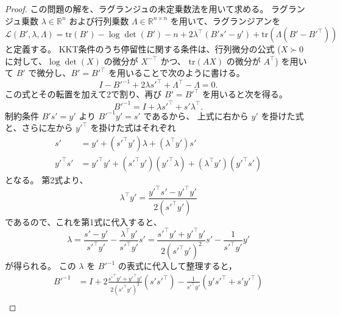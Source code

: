 \documentclass[0_main]{subfiles}
\begin{document}
\begin{proof}
    この問題の解を、ラグランジュの未定乗数法を用いて求める。
    ラグランジュ乗数 $\lambda\in\mathbb{R}^n$ および行列乗数 $\Lambda\in\mathbb{R}^{n\times n}$ を用いて、ラグランジアンを
    \begin{equation*}
        \mathcal{L}(B',\lambda,\Lambda) = \mathrm{tr}(B') -\log\det(B') -n +2\lambda^\top(B's'-y') +\mathrm{tr}\left(\Lambda(B'-B'^\top)\right)
    \end{equation*}
    と定義する。
    KKT条件のうち停留性に関する条件は、行列微分の公式 ($X \succ 0$ に対して、$\log\det(X)$ の微分が $X^{-\top}$ かつ、 $\mathrm{tr}(AX)$ の微分が $A^\top$) を用いて $B'$ で微分し、$B'=B'^\top$ を用いることで次のように書ける。
    \begin{equation*}
        I-B'^{-1}
        +2\lambda s'^\top
        +\Lambda^\top-\Lambda
        =0.
    \end{equation*}
    この式とその転置を加えて2で割り、再び $B' = B'^\top$ を用いると次を得る。
    \begin{equation*}
        B'^{-1} = I+\lambda s'^\top+s'\lambda^\top.
    \end{equation*}
    制約条件 $B's'=y'$ より $B'^{-1}y'=s'$ であるから、
    上式に右から $y'$ を掛けた式と、さらに左から $y'^\top$ を掛けた式はそれぞれ
    \begin{align*}
        s'         & = y' +(s'^\top y')\lambda +(\lambda^\top y')s'                               \\
        y'^\top s' & = y'^\top y' + (s'^\top y')(y'^\top \lambda) + (\lambda^\top y')(y'^\top s')
    \end{align*}
    となる。
    第2式より、
    \begin{equation*}
        \lambda^\top y'
        =
        \frac{y'^\top s'-y'^\top y'}{2(s'^\top y')}
    \end{equation*}
    であるので、これを第1式に代入すると、
    \begin{equation*}
        \lambda
        = \frac{s'-y'}{s'^\top y'} - \frac{\lambda^\top y'}{s'^\top y'}s'
        =
        \frac{s'^\top y'+y'^\top y'}{2(s'^\top y')^2}s'
        -\frac{1}{s'^\top y'}y'
    \end{equation*}
    が得られる。
    この $\lambda$ を $B'^{-1}$ の表式に代入して整理すると，
    \begin{align*}
        B'^{-1} & = I + 2\frac{s'^\top y'+y'^\top y'}{2(s'^\top y')^2}(s' s'^\top)
        -\frac{1}{s'^\top y'}(y' s'^\top + s' y'^\top)                                                                                        \\

\end{align*}
\end{proof}
\end{document}
